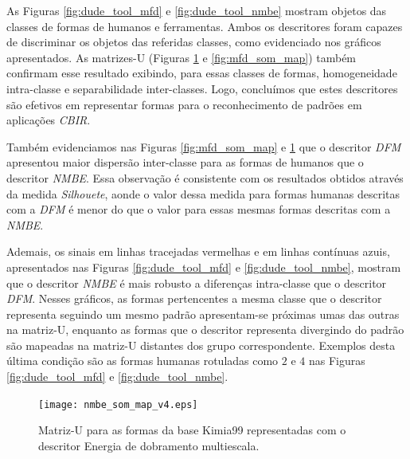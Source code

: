 As Figuras \ref{fig:dude_tool_mfd} e \ref{fig:dude_tool_nmbe} mostram objetos das classes de formas de humanos e ferramentas. Ambos os descritores foram capazes de discriminar os objetos das referidas classes, como evidenciado nos gráficos apresentados. As matrizes-U (Figuras \ref{fig:nmbe_som_map} e \ref{fig:mfd_som_map}) também confirmam esse resultado exibindo, para essas classes de formas, homogeneidade intra-classe e separabilidade inter-classes. Logo, concluímos que estes descritores são efetivos em representar formas para o reconhecimento de padrões em aplicações \emph{CBIR}.

Também evidenciamos nas Figuras \ref{fig:mfd_som_map} e \ref{fig:nmbe_som_map} que o descritor \emph{DFM} apresentou maior dispersão inter-classe para as formas de humanos que o descritor \emph{NMBE}. Essa observação é consistente com os resultados obtidos através da medida \emph{Silhouete}, aonde o valor dessa medida para formas humanas descritas com a \emph{DFM} é menor do que o valor para essas mesmas formas descritas com a \emph{NMBE}.

Ademais, os sinais em linhas tracejadas vermelhas e em linhas contínuas azuis, apresentados nas Figuras \ref{fig:dude_tool_mfd} e \ref{fig:dude_tool_nmbe}, mostram que o descritor \emph{NMBE} é mais robusto a diferenças intra-classe que o descritor \emph{DFM}. Nesses gráficos, as formas pertencentes a mesma classe que o descritor representa seguindo um mesmo padrão apresentam-se próximas umas das outras na matriz-U, enquanto as formas que o descritor representa divergindo do padrão são mapeadas na matriz-U distantes dos grupo correspondente. Exemplos desta última condição são as formas humanas rotuladas como $2$ e $4$ nas Figuras \ref{fig:dude_tool_mfd} e \ref{fig:dude_tool_nmbe}.

\begin{figure}[h!]
  \caption{\label{fig:nmbe_som_map} Matriz-U para as formas da base Kimia99 representadas com o descritor Energia de dobramento multiescala.}
  \centering
  \texttt{[image: nmbe\_som\_map\_v4.eps]}
\end{figure}

